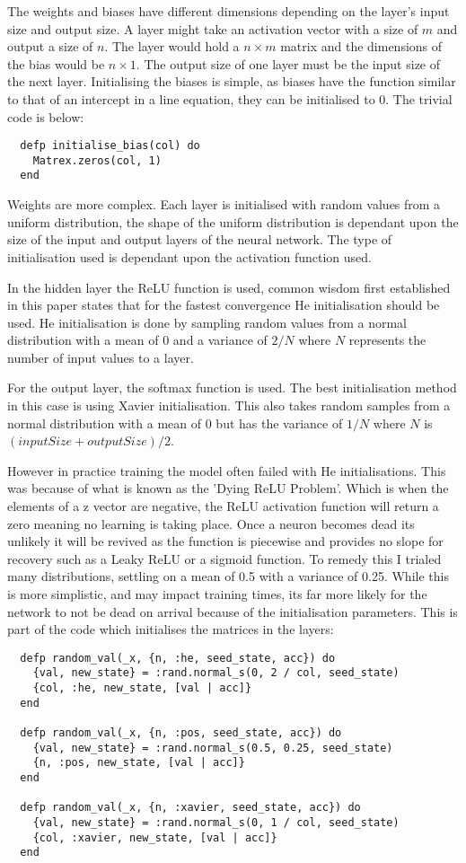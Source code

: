The weights and biases have different dimensions depending on the layer's input
size and output size. A layer might take an activation vector with a size of
\(m\) and output a size of \(n\). The layer would hold a \(n \times m\) matrix
and the dimensions of the bias would be \(n \times 1\). The output size of one
layer must be the input size of the next layer. Initialising the biases is
simple, as biases have the function similar to that of an intercept in a line
equation, they can be initialised to 0. The trivial code is below:
\begin{lstlisting}
  defp initialise_bias(col) do
    Matrex.zeros(col, 1)
  end
\end{lstlisting} 
Weights are more complex. Each layer is initialised with random values from a
uniform distribution, the shape of the uniform distribution is dependant upon
the size of the input and output layers of the neural network. The type of
initialisation used is dependant upon the activation function used.

In the hidden layer the ReLU function is used, common wisdom first established
in this paper \cite{he2015delving} states that for the fastest convergence He
initialisation should be used. He initialisation is done by sampling random
values from a normal distribution with a mean of 0 and a variance of \( 2/N \)
where \(N\) represents the number of input values to a layer.

For the output layer, the softmax function is used. The best initialisation
method in this case is using Xavier
initialisation. \cite{glorot2010understanding} This also takes random samples
from a normal distribution with a mean of 0 but has the variance of \( 1/N \)
where \(N\) is \( (inputSize + outputSize) / 2 \).

However in practice training the model often failed with He initialisations.
This was because of what is known as the 'Dying ReLU Problem'. Which is when the
elements of a z vector are negative, the ReLU activation function
will return a zero meaning no learning is taking place. Once a neuron becomes
dead its unlikely it will be revived as the function is piecewise and provides
no slope for recovery such as a Leaky ReLU or a sigmoid function. To remedy this
I trialed many distributions, settling on a mean of 0.5 with a variance of 0.25.
While this is more simplistic, and may impact training times, its far more
likely for the network to not be dead on arrival because of the initialisation
parameters. This is part of the code which initialises the matrices in the layers:
\begin{lstlisting}
  defp random_val(_x, {n, :he, seed_state, acc}) do
    {val, new_state} = :rand.normal_s(0, 2 / col, seed_state)
    {col, :he, new_state, [val | acc]}
  end

  defp random_val(_x, {n, :pos, seed_state, acc}) do
    {val, new_state} = :rand.normal_s(0.5, 0.25, seed_state)
    {n, :pos, new_state, [val | acc]}
  end

  defp random_val(_x, {n, :xavier, seed_state, acc}) do
    {val, new_state} = :rand.normal_s(0, 1 / col, seed_state)
    {col, :xavier, new_state, [val | acc]}
  end
\end{lstlisting} 


